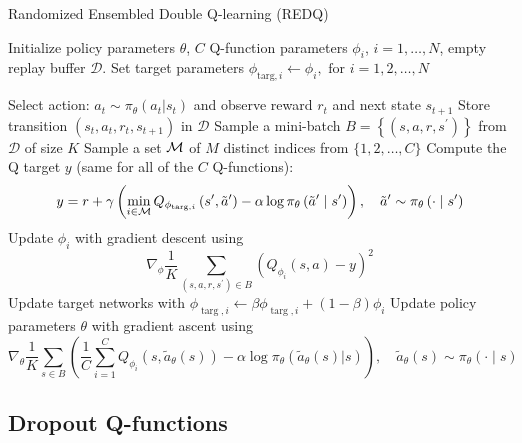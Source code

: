 \begin{algorithm}[H]
\caption{Randomized Ensembled Double Q-learning (REDQ)}
\begin{algorithmic}[1]
\State Initialize policy parameters $\theta$, $C$ Q-function parameters $\phi_{i}$, $i=1,\ldots,N$, empty replay buffer $\mathcal{D}$. Set target parameters $\phi_{\text {targ}, i} \leftarrow \phi_{i}, \text{ for } i =1, 2, \ldots, N$

\Repeat
    \State Select action: $a_{t} \sim \pi_{\theta}(a_{t} | s_{t})$ and observe reward $r_{t}$ and next state $s_{t+1}$
    \State Store transition $(s_{t}, a_{t}, r_{t}, s_{t+1})$ in $\mathcal{D}$
        \State Sample a mini-batch $B=\left\{\left(s, a, r, s^{\prime} \right)\right\}$ from $\mathcal{D}$ of size $K$
        \State Sample a set $\cal{M}$ of $M$ distinct indices from $\{1, 2, \ldots, C\}$
        \State Compute the Q target $y$ (same for all of the $C$ Q-functions):
        \[
        y=r+\gamma\left(\min _{i\in \cal{M}} Q_{\phi_{\text {targ},i}}\left(s^{\prime}, \tilde{a}^{\prime}\right)-\alpha \log \pi_{\theta}\left(\tilde{a}^{\prime} \mid s^{\prime}\right)\right),\quad \tilde{a}^{\prime} \sim \pi_{\theta}\left(\cdot \mid s^{\prime}\right)
        \]
            \State Update $\phi_i$ with gradient descent using
            \[
            \nabla_{\phi} \frac{1}{K} \sum_{\left(s, a, r, s^{\prime} \right) \in B}\left(Q_{\phi_{i}}(s, a)-y\right)^{2} 
            \]
            \State Update target networks with $\phi_{\operatorname{targ},i} \leftarrow \beta \phi_{\operatorname{targ},i}+(1-\beta) \phi_{i}$
        \EndFor
    \EndFor
    \State Update policy parameters $\theta$ with gradient ascent using
    \[
    \nabla_{\theta} \frac{1}{K} \sum_{s \in B}\left(\frac{1}{C}\sum_{i =1}^{C} Q_{\phi_{i}}\left(s, \tilde{a}_{\theta}(s)\right)-\alpha \log \pi_{\theta}\left(\tilde{a}_{\theta}(s) | s\right)\right),
    \quad \tilde{a}_{\theta}(s) \sim \pi_{\theta}(\cdot \mid s)
    \]
\end{algorithmic}
\end{algorithm}


\subsection{Dropout Q-functions}\label{subsec:DROQ}

